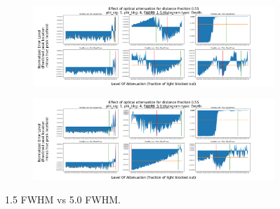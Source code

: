 \documentclass{article}
\begin{document}
\begin{figure}[H]
\centering
\begin{subfigure}[b]{1\textwidth}
\includegraphics[width=1\linewidth]{1.5Example.png}
\label{fig:1.5Example}
\end{subfigure}
\begin{subfigure}[b]{1\textwidth}
\includegraphics[width=1\linewidth]{5.0Example.png}
\label{fig:5.0Example}
\end{subfigure}
\caption{\label{fig:pulseComparison}1.5 FWHM vs 5.0 FWHM.}
\end{figure}
\end{document}
